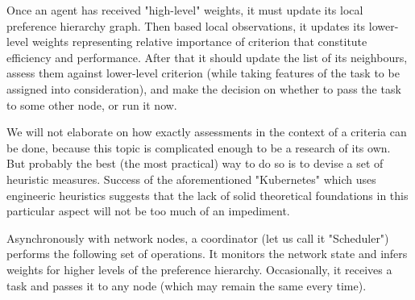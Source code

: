 Once an agent has received "high-level" weights, it must update its local preference hierarchy graph.
Then based local observations, it updates its lower-level weights representing relative importance of criterion that constitute efficiency and performance.
After that it should update the list of its neighbours, assess them against lower-level criterion (while taking features of the task to be assigned into consideration), and make the decision on whether to pass the task to some other node, or run it now.

We will not elaborate on how exactly assessments in the context of a criteria can be done, because this topic is complicated enough to be a research of its own.
But probably the best (the most practical) way to do so is to devise a set of heuristic measures.
Success of the aforementioned "Kubernetes" which uses engineeric heuristics suggests that the lack of solid theoretical foundations in this particular aspect will not be too much of an impediment.


Asynchronously with network nodes, a coordinator (let us call it "Scheduler") performs the following set of operations. It monitors the network state and infers weights for higher levels of the preference hierarchy. Occasionally, it receives a task and passes it to any node (which may remain the same every time).
